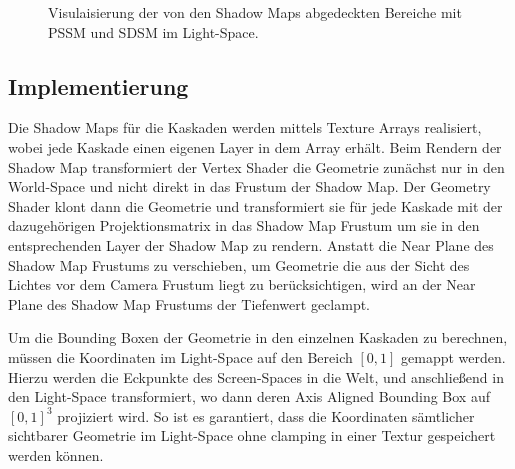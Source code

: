 \documentclass[runningheaders,a4paper]{llncs}
\begin{document}
\begin{figure}
	\centering

	\caption{Visulaisierung der von den Shadow Maps abgedeckten Bereiche mit PSSM und SDSM im Light-Space.}
\end{figure}



\subsection{Implementierung}

Die Shadow Maps für die Kaskaden werden mittels Texture Arrays realisiert, wobei jede Kaskade einen eigenen Layer in dem Array erhält.
Beim Rendern der Shadow Map transformiert der Vertex Shader die Geometrie zunächst nur in den World-Space und nicht direkt in das Frustum der Shadow Map.
Der Geometry Shader klont dann die Geometrie und transformiert sie für jede Kaskade mit der dazugehörigen Projektionsmatrix in das Shadow Map Frustum um sie in den entsprechenden Layer der Shadow Map zu rendern.
Anstatt die Near Plane des Shadow Map Frustums zu verschieben, um Geometrie die aus der Sicht des Lichtes vor dem Camera Frustum liegt zu berücksichtigen, wird an der Near Plane des Shadow Map Frustums der Tiefenwert geclampt.

Um die Bounding Boxen der Geometrie in den einzelnen Kaskaden zu berechnen, müssen die Koordinaten im Light-Space auf den Bereich $[0, 1]$ gemappt werden.
Hierzu werden die Eckpunkte des Screen-Spaces in die Welt, und anschließend in den Light-Space transformiert, wo dann deren Axis Aligned Bounding Box auf $[0, 1]^3$ projiziert wird.
So ist es garantiert, dass die Koordinaten sämtlicher sichtbarer Geometrie im Light-Space ohne clamping in einer Textur gespeichert werden können.
\end{document}
